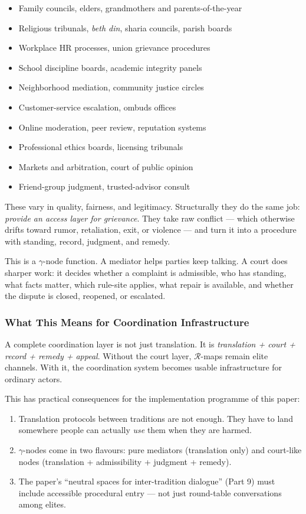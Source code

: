 \documentclass[
]{article}
\providecommand{\tightlist}{%
  \setlength{\itemsep}{0pt}\setlength{\parskip}{0pt}}
\begin{document}
\begin{itemize}
\tightlist
\item
  Family councils, elders, grandmothers and parents-of-the-year
\item
  Religious tribunals, \emph{beth din}, sharia councils, parish boards
\item
  Workplace HR processes, union grievance procedures
\item
  School discipline boards, academic integrity panels
\item
  Neighborhood mediation, community justice circles
\item
  Customer-service escalation, ombuds offices
\item
  Online moderation, peer review, reputation systems
\item
  Professional ethics boards, licensing tribunals
\item
  Markets and arbitration, court of public opinion
\item
  Friend-group judgment, trusted-advisor consult
\end{itemize}

These vary in quality, fairness, and legitimacy. Structurally they
do the same job: \emph{provide an access layer for grievance}. They
take raw conflict --- which otherwise drifts toward rumor,
retaliation, exit, or violence --- and turn it into a procedure with
standing, record, judgment, and remedy.

This is a \(\gamma\)-node function. A mediator helps parties keep talking. A
court does sharper work: it decides whether a complaint is
admissible, who has standing, what facts matter, which rule-site
applies, what repair is available, and whether the dispute is
closed, reopened, or escalated.

\subsubsection{What This Means for Coordination
Infrastructure}\label{what-courts-mean-for-coordination}

A complete coordination layer is not just translation. It is
\emph{translation + court + record + remedy + appeal}. Without the
court layer, \(\mathcal{R}\)-maps remain elite channels. With it,
the coordination system becomes usable infrastructure for ordinary
actors.

This has practical consequences for the implementation programme of
this paper:

\begin{enumerate}
\def\labelenumi{\arabic{enumi}.}
\tightlist
\item
  Translation protocols between traditions are not enough. They have
  to land somewhere people can actually \emph{use} them when they
  are harmed.
\item
  \(\gamma\)-nodes come in two flavours: pure mediators (translation only)
  and court-like nodes (translation + admissibility + judgment +
  remedy).
\item
  The paper's ``neutral spaces for inter-tradition dialogue''
  (Part 9) must include accessible procedural entry --- not just
  round-table conversations among elites.
\end{enumerate}
\end{document}
